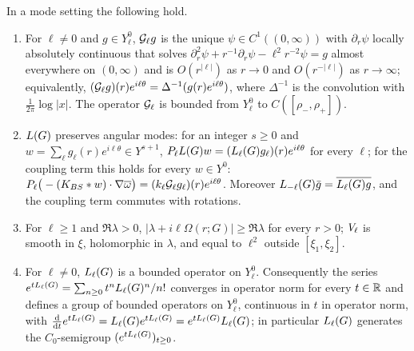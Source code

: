 \begin{lemma}
\label{lem:sector}
In a mode setting the following hold.
\begin{enumerate}[label=\textup{(\arabic*)}]
\item For $\ell\ne0$ and $g\in Y^0_\ell$, $\mathcal{G}_\ell g$ is the unique
  $\psi\in C^1((0,\infty))$ with $\partial_r\psi$ locally absolutely continuous that solves
  $\partial_r^2\psi+r^{-1}\partial_r\psi-\ell^2r^{-2}\psi=g$ almost everywhere on $(0,\infty)$ and is
  $O(r^{|\ell|})$ as $r\to0$ and $O(r^{-|\ell|})$ as $r\to\infty$; equivalently,
  $(\mathcal{G}_\ell g)(r)e^{i\ell\theta}=\Delta^{-1}(g(r)e^{i\ell\theta})$, where
  $\Delta^{-1}$ is the convolution with $\frac1{2\pi}\log|x|$. The operator
  $\mathcal{G}_\ell$ is bounded from $Y^0_\ell$ to $C([\rho_-,\rho_+])$.
\item $L(G)$ preserves angular modes: for an integer $s\ge0$ and
  $w=\sum_\ell g_\ell(r)e^{i\ell\theta}\in Y^{s+1}$,
  $P_\ell L(G)w=(L_{\ell}(G)g_\ell)(r)e^{i\ell\theta}$ for every $\ell$; for the
  coupling term this holds for every $w\in Y^0$:
  $P_\ell\big(-(K_{BS}\ast w)\cdot\nabla\overline{\omega}\big)=(k_\ell\mathcal{G}_\ell g_\ell)(r)e^{i\ell\theta}$.
  Moreover $L_{-\ell}(G)\bar g=\overline{L_{\ell}(G)g}$, and the coupling term
  commutes with rotations.
\item For $\ell\ge1$ and $\Re\lambda>0$, $|\lambda+i\ell\Omega(r;G)|\ge\Re\lambda$ for
  every $r>0$; $V_\ell$ is smooth in $\xi$, holomorphic in $\lambda$, and
  equal to $\ell^2$ outside $[\xi_1,\xi_2]$.
\item For $\ell\ne0$, $L_{\ell}(G)$ is a bounded operator on $Y^0_\ell$.
  Consequently the series
  $e^{tL_{\ell}(G)}=\sum_{n\ge0}t^nL_{\ell}(G)^n/n!$ converges in operator
  norm for every $t\in\mathbb{R}$ and defines a group of bounded operators on $Y^0_\ell$,
  continuous in $t$ in operator norm, with
  $\frac{\dd}{\dd t}e^{tL_{\ell}(G)}=L_{\ell}(G)e^{tL_{\ell}(G)}
  =e^{tL_{\ell}(G)}L_{\ell}(G)$; in particular $L_{\ell}(G)$ generates the
  $C_0$-semigroup $(e^{tL_{\ell}(G)})_{t\ge0}$.
\end{enumerate}
\end{lemma}
